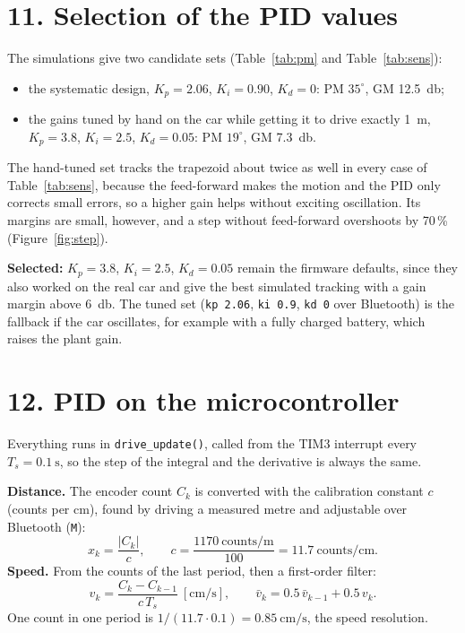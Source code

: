\documentclass[letterpaper, 11pt]{article}
\begin{document}
\section*{11. Selection of the PID values}

The simulations give two candidate sets (Table~\ref{tab:pm} and Table~\ref{tab:sens}):
\begin{itemize}[nosep]
  \item the systematic design, $K_p = 2.06$, $K_i = 0.90$, $K_d = 0$:
        PM $35^\circ$, GM \SI{12.5}{\decibel};
  \item the gains tuned by hand on the car while getting it to drive exactly
        \SI{1}{\meter}, $K_p = 3.8$, $K_i = 2.5$, $K_d = 0.05$: PM $19^\circ$,
        GM \SI{7.3}{\decibel}.
\end{itemize}
The hand-tuned set tracks the trapezoid about twice as well in every case of
Table~\ref{tab:sens}, because the feed-forward makes the motion and the PID only
corrects small errors, so a higher gain helps without exciting oscillation. Its
margins are small, however, and a step without feed-forward overshoots by 70\,\%
(Figure~\ref{fig:step}).

\textbf{Selected:} $K_p = 3.8$, $K_i = 2.5$, $K_d = 0.05$ remain the firmware defaults,
since they also worked on the real car and give the best simulated tracking with a
gain margin above \SI{6}{\decibel}. The tuned set (\texttt{kp 2.06}, \texttt{ki 0.9},
\texttt{kd 0} over Bluetooth) is the fallback if the car oscillates, for example with
a fully charged battery, which raises the plant gain.

\section*{12. PID on the microcontroller}

Everything runs in \texttt{drive\_update()}, called from the TIM3 interrupt every
$T_s = \SI{0.1}{\second}$, so the step of the integral and the derivative is
always the same.

\textbf{Distance.} The encoder count $C_k$ is converted with the calibration
constant $c$ (counts per cm), found by driving a measured metre and adjustable over
Bluetooth (\texttt{M}):
\[
  x_k = \frac{|C_k|}{c}, \qquad c = \frac{1170\ \text{counts/m}}{100} = 11.7\ \text{counts/cm}.
\]
\textbf{Speed.} From the counts of the last period, then a first-order filter:
\[
  v_k = \frac{C_k - C_{k-1}}{c\,T_s}\ [\si{\centi\meter\per\second}], \qquad
  \bar v_k = 0.5\,\bar v_{k-1} + 0.5\,v_k .
\]
One count in one period is $1/(11.7 \cdot 0.1) = \SI{0.85}{\centi\meter\per\second}$,
the speed resolution.
\end{document}
